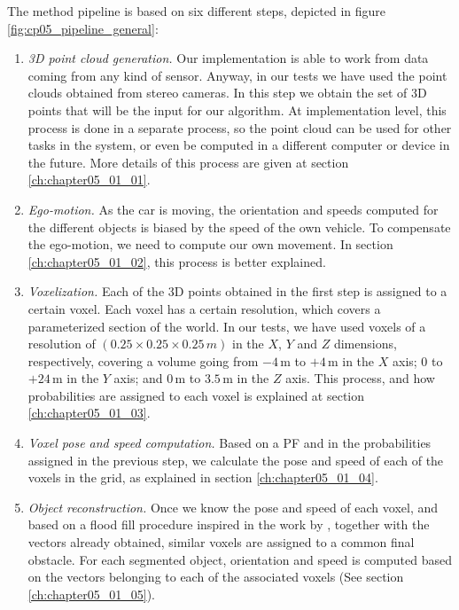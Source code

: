 The method pipeline is based on six different steps, depicted in figure \ref{fig:cp05_pipeline_general}:
\begin{enumerate}
 \item \emph{3D point cloud generation.} Our implementation is able to work from data coming from any kind of sensor. Anyway, in our tests we have used the point clouds obtained from stereo cameras. In this step we obtain the set of 3D points that will be the input for our algorithm. At implementation level, this process is done in a separate process, so the point cloud can be used for other tasks in the system, or even be computed in a different computer or device in the future. More details of this process are given at section \ref{ch:chapter05_01_01}.
 \item \emph{Ego-motion.} As the car is moving, the orientation and speeds computed for the different objects is biased by the speed of the own vehicle. To compensate the ego-motion, we need to compute our own movement. In section \ref{ch:chapter05_01_02}, this process is better explained.
 \item \emph{Voxelization.} Each of the 3D points obtained in the first step is assigned to a certain voxel. Each voxel has a certain resolution, which covers a parameterized section of the world. In our tests, we have used voxels of a resolution of $(0.25\times0.25\times0.25\,m)$ in the $X$, $Y$ and $Z$ dimensions, respectively, covering a volume going from $-4$\,m to $+4$\,m in the $X$ axis; $0$ to $+24$\,m in the $Y$ axis; and $0$\,m to $3.5$\,m in the $Z$ axis. This process, and how probabilities are assigned to each voxel is explained at section \ref{ch:chapter05_01_03}.
 \item \emph{Voxel pose and speed computation.} Based on a \ac{PF} and in the probabilities assigned in the previous step, we calculate the pose and speed of each of the voxels in the grid, as explained in section \ref{ch:chapter05_01_04}.
 \item \emph{Object reconstruction.} Once we know the pose and speed of each voxel, and based on a flood fill procedure inspired in the work by \cite{broggi2013}, together with the vectors already obtained, similar voxels are assigned to a common final obstacle. For each segmented object, orientation and speed is computed based on the vectors belonging to each of the associated voxels (See section \ref{ch:chapter05_01_05}).
\end{enumerate}

